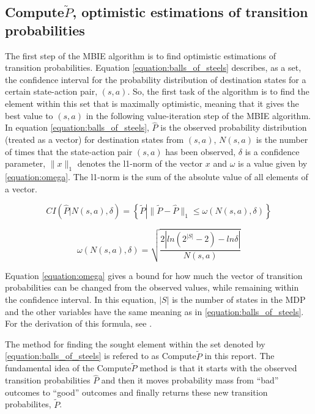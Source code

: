 
\subsection{Compute$\tilde{P}$, optimistic estimations of transition probabilities}
\label{sec:computep}

The first step of the MBIE algorithm is to find optimistic estimations of transition probabilities. Equation \eqref{equation:balls_of_steels} describes, as a set, the confidence interval for the probability distribution of destination states for a certain state-action pair, $(s,a)$. So, the first task of the algorithm is to find the element within this set that is maximally optimistic, meaning that it gives the best value to $(s,a)$ in the following value-iteration step of the MBIE algorithm. In equation \eqref{equation:balls_of_steels}, $\hat{P}$ is the observed probability distribution (treated as a vector) for destination states from $(s,a)$, $N(s,a)$ is the number of times that the state-action pair $(s,a)$ has been observed, $\delta$ is a confidence parameter, $\|x\|_1$ denotes the l1-norm of the vector $x$ and $\omega$ is a value given by \eqref{equation:omega}. The l1-norm is the sum of the absolute value of all elements of a vector. 

\begin{equation}
\label{equation:balls_of_steels}
CI\left(\hat{P} \left| N(s, a), \delta\right.\right)  = \left\{\tilde{P} \left| \|\tilde{P} - \hat{P}\|_1 \le \omega(N(s,a), \delta)\right.\right\}
\end{equation}

\begin{equation}
\label{equation:omega}
   \omega(N(s,a),\delta) = {\sqrt{\frac{2|ln(2^{|S|}-2) - ln  \delta |}{N(s,a)}}}
\end{equation}

Equation \eqref{equation:omega} gives a bound for how much the vector of transition probabilities can be changed from the observed values, while remaining within the confidence interval. In this equation, $|S|$ is the number of states in the MDP and the other variables have the same meaning as in \eqref{equation:balls_of_steels}. For the derivation of this formula, see  \textcite{Strehl20081309}.

The method for finding the sought element within the set denoted by \eqref{equation:balls_of_steels} 
is refered to as Compute$\tilde{P}$ in this report. 
The fundamental idea of the Compute$\tilde{P}$ method is that it starts with
the observed transition probabilities $\hat{P}$ and then it moves probability
mass from ``bad'' outcomes to ``good'' outcomes and finally returns these new transition probabilites, $\tilde{P}$. 

